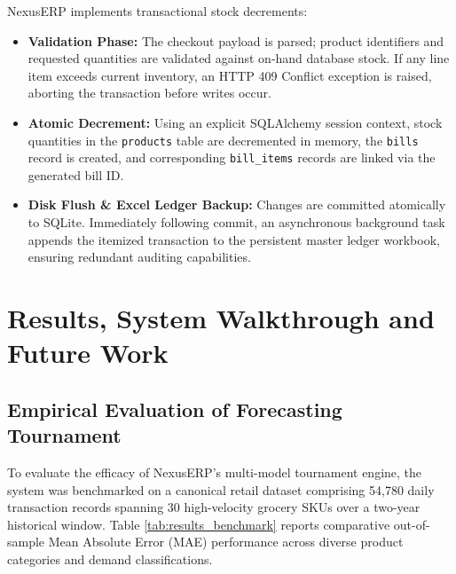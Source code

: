 NexusERP implements transactional stock decrements:
\begin{itemize}
    \item \textbf{Validation Phase:} The checkout payload is parsed; product identifiers and requested quantities are validated against on-hand database stock. If any line item exceeds current inventory, an HTTP 409 Conflict exception is raised, aborting the transaction before writes occur.
    \item \textbf{Atomic Decrement:} Using an explicit SQLAlchemy session context, stock quantities in the \texttt{products} table are decremented in memory, the \texttt{bills} record is created, and corresponding \texttt{bill\_items} records are linked via the generated bill ID.
    \item \textbf{Disk Flush \& Excel Ledger Backup:} Changes are committed atomically to SQLite. Immediately following commit, an asynchronous background task appends the itemized transaction to the persistent master ledger workbook, ensuring redundant auditing capabilities.
\end{itemize}


\clearpage
\chapter{Results, System Walkthrough and Future Work}
\section{Empirical Evaluation of Forecasting Tournament}
To evaluate the efficacy of NexusERP's multi-model tournament engine, the system was benchmarked on a canonical retail dataset comprising 54,780 daily transaction records spanning 30 high-velocity grocery SKUs over a two-year historical window. Table \ref{tab:results_benchmark} reports comparative out-of-sample Mean Absolute Error (MAE) performance across diverse product categories and demand classifications.

